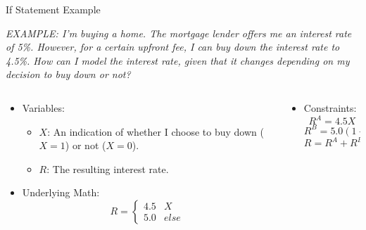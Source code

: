 \documentclass[10pt, aspectratio=169]{beamer}
\begin{document}
\begin{frame}{If Statement Example}
    \begin{center}
        \textit{EXAMPLE: I'm buying a home. The mortgage lender offers me an interest rate of 5\%. However, for a certain upfront fee, I can buy down the interest rate to 4.5\%. How can I model the interest rate, given that it changes depending on my decision to buy down or not?}
    \end{center}
    \begin{columns}
        \begin{column}{0.5\textwidth}
            \begin{itemize}
                \item Variables:
                \begin{itemize}
                    \item $X$: An indication of whether I choose to buy down ($X=1$) or not ($X=0$).
                    \item $R$: The resulting interest rate.
                \end{itemize}
                \item Underlying Math:
                $$R = \begin{cases}
                    4.5 & X \\
                    5.0 & else
                \end{cases}$$
            \end{itemize}
        \end{column}
        \begin{column}{0.5\textwidth}
            \begin{itemize}
                \item Constraints:
                $$R^A = 4.5 X$$
                $$R^B = 5.0 (1-X)$$
                $$R = R^A + R^B$$
            \end{itemize}
        \end{column}
    \end{columns}
\end{frame}
\end{document}
